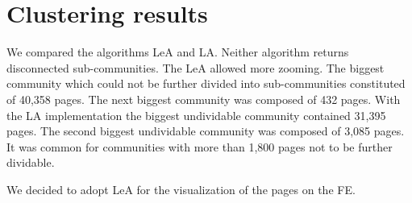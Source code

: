 \label{evaluation}
\section{Clustering results}\label{clusteringEvaluation}
We compared the algorithms LeA and LA. Neither algorithm returns disconnected sub-communities. The LeA allowed more zooming. The biggest community which could not be further divided into sub-communities constituted of 40,358 pages. The next biggest community was composed of 432 pages. With the LA implementation the biggest undividable community contained 31,395 pages. The second biggest undividable community was composed of 3,085 pages. It was common for communities with more than 1,800 pages not to be further dividable.

We decided to adopt LeA for the visualization of the pages on the FE. 

